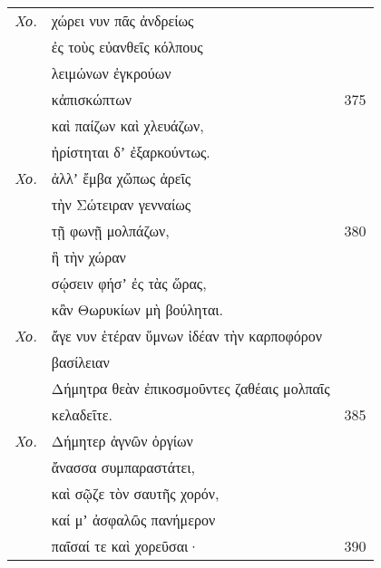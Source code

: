 \documentclass[13pt]{article}
\begin{document}
\begin{greek}
\newpage
\begin{spacing}{1.5}
\begin{tabularx}{\textwidth}{@{}lXr@{}}
\textit{Χο.} & χώρει νυν πᾶς ἀνδρείως &  \\
& ἐς τοὺς εὐανθεῖς κόλπους &  \\
& λειμώνων ἐγκρούων &  \\
& κἀπισκώπτων & 375 \\
& καὶ παίζων καὶ χλευάζων, &  \\
& ἠρίστηται δʼ ἐξαρκούντως. &  \\
\textit{Χο.} & ἀλλʼ ἔμβα χὤπως ἀρεῖς &  \\
& τὴν Σώτειραν γενναίως &  \\
& τῇ φωνῇ μολπάζων, & 380 \\
& ἣ τὴν χώραν &  \\
& σῴσειν φήσʼ ἐς τὰς ὥρας, &  \\
& κἂν Θωρυκίων μὴ βούληται. &  \\
\textit{Χο.} & ἄγε νυν ἑτέραν ὕμνων ἰδέαν τὴν καρποφόρον & \\
& \hspace{3em}βασίλειαν &  \\
& Δήμητρα θεὰν ἐπικοσμοῦντες ζαθέαις μολπαῖς & \\
& \hspace{3em }κελαδεῖτε. & 385 \\
\textit{Χο.} & Δήμητερ ἁγνῶν ὀργίων &  \\
& ἄνασσα συμπαραστάτει, &  \\
& καὶ σῷζε τὸν σαυτῆς χορόν, &  \\
& καί μʼ ἀσφαλῶς πανήμερον &  \\
& παῖσαί τε καὶ χορεῦσαι· & 390 \\


\end{tabularx}
\end{spacing}


\end{greek}
\end{document}
